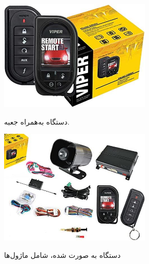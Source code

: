 \documentclass[a4paper,12pt]{report}
\begin{document}
	\begin{figure}[!h]
		\centering
		\footnotesize
		\begin{subfigure}[t]{0.3\linewidth}
			\centering
			\includegraphics[width=0.8\textwidth]{resources/viper_5906V_1.jpg}
			\label{subfig1:fig1:sec3:chap1}
			\caption{
				دستگاه
				به‌همراه جعبه.
			}
		\end{subfigure}
		\hspace*{1cm}
		\begin{subfigure}[t]{0.3\linewidth}
			\centering
			\includegraphics[width=0.8\textwidth]{resources/viper_5906V_2.jpg}
			\label{subfig2:fig1:sec3:chap1}
			\caption{
				دستگاه 	به صورت
				شده، شامل ماژول‌ها
			}
		\end{subfigure}
		\\\vspace*{5mm}%
		\begin{subfigure}[t]{0.3\linewidth}
			\centering

\end{subfigure}
\end{figure}
\end{document}
